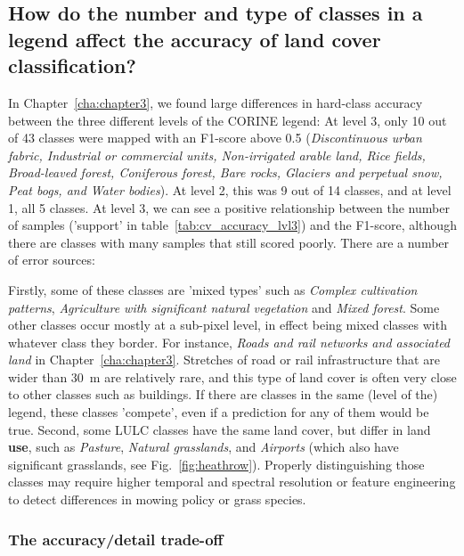    \subsection{How do the number and type of classes in a legend affect the accuracy of land cover classification?}
    \label{syn:rq3}

        In Chapter\@~\ref{cha:chapter3}, we found large differences in hard-class accuracy between the three different levels of the CORINE legend: At level 3, only 10 out of 43 classes were mapped with an F1-score above 0.5 (\textit{Discontinuous urban fabric, Industrial or commercial units, Non-irrigated arable land, Rice fields, Broad-leaved forest, Coniferous forest, Bare rocks, Glaciers and perpetual snow, Peat bogs, and Water bodies}). At level 2, this was 9 out of 14 classes, and at level 1, all 5 classes. At level 3, we can see a positive relationship between the number of samples ('support' in table~\ref{tab:cv_accuracy_lvl3}) and the F1-score, although there are classes with many samples that still scored poorly. There are a number of error sources: 

        Firstly, some of these classes are 'mixed types' such as \textit{Complex cultivation patterns}, \textit{Agriculture with significant natural vegetation} and \textit{Mixed forest}. Some other classes occur mostly at a sub-pixel level, in effect being mixed classes with whatever class they border. For instance, \textit{Roads and rail networks and associated land} in Chapter\@~\ref{cha:chapter3}. Stretches of road or rail infrastructure that are wider than 30~m are relatively rare, and this type of land cover is often very close to other classes such as buildings. If there are classes in the same (level of the) legend, these classes 'compete', even if a prediction for any of them would be true. 
        Second, some LULC classes have the same land cover, but differ in land \textbf{use}, such as \textit{Pasture}, \textit{Natural grasslands}, and \textit{Airports} (which also have significant grasslands, see Fig.\@~\ref{fig:heathrow}). Properly distinguishing those classes may require higher temporal and spectral resolution or feature engineering to detect differences in mowing policy or grass species. 

        \subsubsection{The accuracy/detail trade-off}
        
